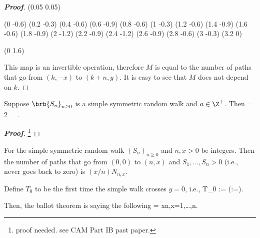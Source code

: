 \begin{proof}[\bf Proof]
{\lpatt (0.05 0.05)

\move (0 -0.6) \lvec (0.2 -0.3) \lvec (0.4 -0.6) \lvec (0.6 -0.9) \lvec (0.8 -0.6) \lvec (1 -0.3) \lvec (1.2 -0.6) \lvec (1.4 -0.9) \lvec (1.6 -0.6) \lvec (1.8 -0.9) \lvec (2 -1.2) \lvec (2.2 -0.9) \lvec (2.4 -1.2) \lvec (2.6 -0.9) \lvec
(2.8 -0.6) \lvec (3 -0.3) \lvec (3.2 0)


\move (0 1.6)

}

This map is an invertible operation, therefore $M$ is equal to the number of paths that go from $(k,-x)$ to $(k+n,y)$. It is easy to see that $M$ does not depend on $k$.
\end{proof}

\begin{corollary}
Suppose $\brb{S_n}_{n\geq 0}$ is a simple symmetric random walk and $a\in \Z^+$. Then
\be
\pro{} = 2\pro{} = \pro{}.
\ee
\end{corollary}

\begin{proof}[\bf Proof]
\footnote{proof needed. see CAM Part IB past paper.}
\end{proof}



\begin{theorem}\label{thm:ballot_problem}
For the simple symmetric random walk $(S_n)_{n\geq 0}$ and $n,x>0$ be integers. Then the number of paths that go from $(0,0)$ to $(n,x)$ and $S_1,\dots,S_n>0$ (i.e., never goes back to zero) is $(x/n) N_{n,x}$.
\end{theorem}

\begin{remark}
Define $T_0$ to be the first time the simple walk crosses $y=0$, i.e.,
\be
T_0 := \inf{}\qquad (\inf \emptyset :=\infty).
\ee

Then, the ballot theorem is saying the following
\be
\pro{} = \frac xn,\qquad \forall x=1,\dots,n.
\ee
\end{remark}

